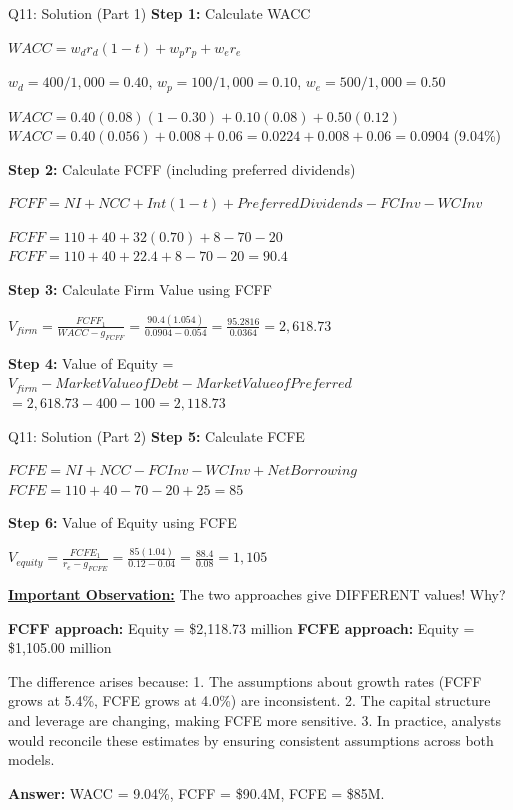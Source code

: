 \documentclass{beamer}
\renewcommand{\scriptsize}{\fontsize{6pt}{7pt}\selectfont}
\begin{document}
	\begin{frame}{Q11: Solution (Part 1)}
		\scriptsize
		\textbf{Step 1:} Calculate WACC
		
		$WACC = w_d r_d(1-t) + w_p r_p + w_e r_e$
		
		$w_d = 400/1,000 = 0.40$, $w_p = 100/1,000 = 0.10$, $w_e = 500/1,000 = 0.50$
		
		$WACC = 0.40(0.08)(1-0.30) + 0.10(0.08) + 0.50(0.12)$
		$WACC = 0.40(0.056) + 0.008 + 0.06 = 0.0224 + 0.008 + 0.06 = 0.0904$ (9.04\%)
		
		\vspace{2pt}
		\textbf{Step 2:} Calculate FCFF (including preferred dividends)
		
		$FCFF = NI + NCC + Int(1-t) + Preferred Dividends - FCInv - WCInv$
		
		$FCFF = 110 + 40 + 32(0.70) + 8 - 70 - 20$
		$FCFF = 110 + 40 + 22.4 + 8 - 70 - 20 = 90.4$
		
		\vspace{2pt}
		\textbf{Step 3:} Calculate Firm Value using FCFF
		
		$V_{firm} = \frac{FCFF_1}{WACC - g_{FCFF}} = \frac{90.4(1.054)}{0.0904 - 0.054} = \frac{95.2816}{0.0364} = 2,618.73$
		
		\vspace{2pt}
		\textbf{Step 4:} Value of Equity = $V_{firm} - Market Value of Debt - Market Value of Preferred$
		$= 2,618.73 - 400 - 100 = 2,118.73$
	\end{frame}
	
	\begin{frame}{Q11: Solution (Part 2)}
		\scriptsize
		\textbf{Step 5:} Calculate FCFE
		
		$FCFE = NI + NCC - FCInv - WCInv + Net Borrowing$
		$FCFE = 110 + 40 - 70 - 20 + 25 = 85$
		
		\vspace{2pt}
		\textbf{Step 6:} Value of Equity using FCFE
		
		$V_{equity} = \frac{FCFE_1}{r_e - g_{FCFE}} = \frac{85(1.04)}{0.12 - 0.04} = \frac{88.4}{0.08} = 1,105$
		
		\vspace{2pt}
		\underline{\textbf{Important Observation:}} The two approaches give DIFFERENT values! Why?
		
		\vspace{2pt}
		\textbf{FCFF approach:} Equity = \$2,118.73 million
		\textbf{FCFE approach:} Equity = \$1,105.00 million
		
		\vspace{2pt}
		The difference arises because:
		1. The assumptions about growth rates (FCFF grows at 5.4\%, FCFE grows at 4.0\%) are inconsistent.
		2. The capital structure and leverage are changing, making FCFE more sensitive.
		3. In practice, analysts would reconcile these estimates by ensuring consistent assumptions across both models.
		
		\textbf{Answer:} WACC = 9.04\%, FCFF = \$90.4M, FCFE = \$85M.
	\end{frame}
	
\end{document}
